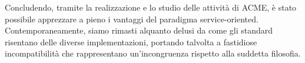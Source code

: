 \documentclass[twoside]{article}
\begin{document}
Concludendo, tramite la realizzazione e lo studio delle attività di ACME, è stato possibile
apprezzare a pieno i vantaggi del paradigma service-oriented. Contemporaneamente,
siamo rimasti alquanto delusi da come gli standard risentano delle diverse implementazioni,
portando talvolta a fastidiose incompatibilità che rappresentano un'incongruenza rispetto alla 
suddetta filosofia.



\end{document}
